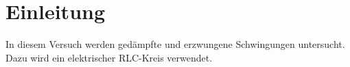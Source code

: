 
\section{Einleitung}
In diesem Versuch werden gedämpfte und erzwungene Schwingungen untersucht.
Dazu wird ein elektrischer RLC-Kreis verwendet.